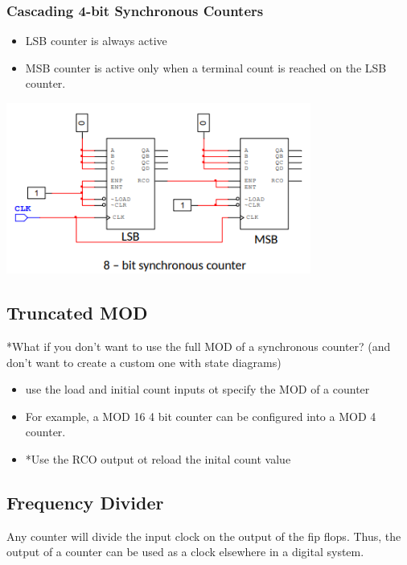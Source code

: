 \documentclass[a4paper,12pt]{article}
\begin{document}
            \subsubsection{Cascading 4-bit Synchronous Counters}
                \begin{itemize}
                    \item LSB counter is always active
                    \item MSB counter is active only when a terminal count is reached on the LSB counter.
                \end{itemize}
                \includegraphics[width=10cm]{4bitsyncCascaded.png}

        \subsection{Truncated MOD}
            *What if you don't want to use the full MOD of a synchronous counter? (and don't want to create a custom one with state diagrams)
            \begin{itemize}
                \item use the load and initial count inputs ot specify the MOD of a counter
                \item For example, a MOD 16 4 bit counter can be configured into a MOD 4 counter.
                \item *Use the RCO output ot reload the inital count value
            \end{itemize}

        \subsection{Frequency Divider}
            Any counter will divide the input clock on the output of the fip flops. Thus, the output of a counter can be used as a clock elsewhere in a digital system.
            
\end{document}
